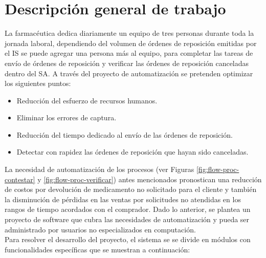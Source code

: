 \section{Descripción general de trabajo}
La farmacéutica dedica diariamente un equipo de tres personas durante toda la jornada laboral, dependiendo del volumen de órdenes de reposición emitidas por el IS se puede agregar una persona más al equipo, para completar las tareas de envío de órdenes de reposición y verificar las órdenes de reposición canceladas dentro del SA. A través del proyecto de automatización se pretenden optimizar los siguientes puntos:
\begin{itemize}
\item Reducción del esfuerzo de recursos humanos.
\item Eliminar los errores de captura.
\item Reducción del tiempo dedicado al envío de las órdenes de reposición.
\item Detectar con rapidez las órdenes de reposición que hayan sido canceladas.
\end{itemize}
La necesidad de automatización de los procesos (ver Figuras \ref{fig:flow-proc-contestar} y \ref{fig:flow-proc-verificar}) antes mencionados pronostican una reducción de costos por devolución de medicamento no solicitado para el cliente y también la disminución de pérdidas en las ventas por solicitudes no atendidas en los rangos de tiempo acordados con el comprador. Dado lo anterior, se plantea un proyecto de software que cubra las necesidades de automatización y pueda ser administrado por usuarios no especializados en computación.\\
Para resolver el desarrollo del proyecto, el sistema se se divide en módulos con funcionalidades específicas que se muestran a continuación:
